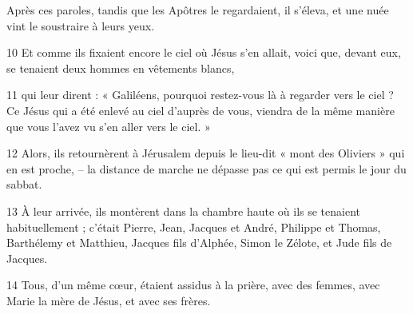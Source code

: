 Après ces paroles, tandis que les Apôtres le regardaient, il s’éleva, et une nuée vint le soustraire à leurs yeux.

10 Et comme ils fixaient encore le ciel où Jésus s’en allait, voici que, devant eux, se tenaient deux hommes en vêtements blancs,

11 qui leur dirent : « Galiléens, pourquoi restez-vous là à regarder vers le ciel ? Ce Jésus qui a été enlevé au ciel d’auprès de vous, viendra de la même manière que vous l’avez vu s’en aller vers le ciel. »

12 Alors, ils retournèrent à Jérusalem depuis le lieu-dit « mont des Oliviers » qui en est proche, – la distance de marche ne dépasse pas ce qui est permis le jour du sabbat.

13 À leur arrivée, ils montèrent dans la chambre haute où ils se tenaient habituellement ; c’était Pierre, Jean, Jacques et André, Philippe et Thomas, Barthélemy et Matthieu, Jacques fils d’Alphée, Simon le Zélote, et Jude fils de Jacques.

14 Tous, d’un même cœur, étaient assidus à la prière, avec des femmes, avec Marie la mère de Jésus, et avec ses frères.